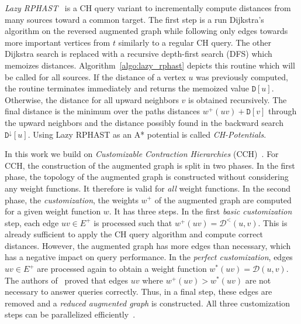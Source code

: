 \documentclass[a4paper,UKenglish,cleveref, autoref, thm-restate,anonymous]{lipics-v2021}
\newcommand*{\dist}{\mathcal{D}}
\newcommand*{\gchu}{G^{\uparrow}}
\begin{document}
\emph{Lazy RPHAST}~\cite{strasser_et_al:LIPIcs.SEA.2021.6} is a CH query variant to incrementally compute distances from many sources toward a common target.
The first step is a run Dijkstra's algorithm on the reversed augmented graph while following only edges towards more important vertices from $t$ similarly to a regular CH query.
The other Dijkstra search is replaced with a recursive depth-first search (DFS) which memoizes distances.
Algorithm~\ref{algo:lazy_rphast} depicts this routine which will be called for all sources.
If the distance of a vertex $u$ was previously computed, the routine terminates immediately and returns the memoized value $\mathtt{D}[u]$.
Otherwise, the distance for all upward neighbors $v$ is obtained recursively.
The final distance is the minimum over the paths distances $w^+(uv) + \mathtt{D}[v]$ through the upward neighbors and the distance possibly found in the backward search $\mathtt{D}^{\downarrow}[u]$.
Using Lazy RPHAST as an A* potential is called \emph{CH-Potentials}.

In this work we build on \emph{Customizable Contraction Hierarchies} (CCH)~\cite{dsw-cch-15}.
For CCH, the construction of the augmented graph is split in two phases.
In the first phase, the topology of the augmented graph is constructed without considering any weight functions.
It therefore is valid for \emph{all} weight functions.
In the second phase, the \emph{customization}, the weights $w^+$ of the augmented graph are computed for a given weight function $w$.
It has three steps.
In the first \emph{basic customization} step, each edge $uv \in E^+$ is processed such that $w^+(uv) = \dist^<(u,v)$.
This is already sufficient to apply the CH query algorithm and compute correct distances.
However, the augmented graph has more edges than necessary, which has a negative impact on query performance.
In the \emph{perfect customization}, edges $uv \in E^+$ are processed again to obtain a weight function $w^*(uv) = \dist(u,v)$.
The authors of~\cite{dsw-cch-15} proved that edges $uv$ where $w^+(uv) > w^*(uv)$ are not necessary to answer queries correctly.
Thus, in a final step, these edges are removed and a \emph{reduced augmented graph} is constructed.
All three customization steps can be parallelized efficiently~\cite{bsw-rttau-19}.
\end{document}
